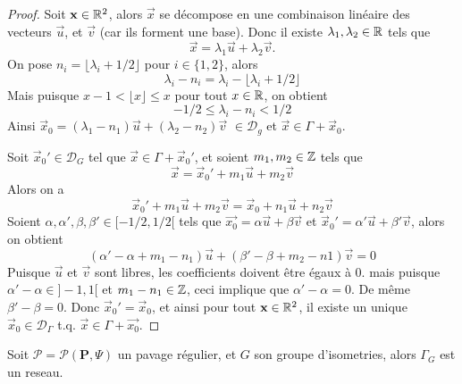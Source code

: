 \begin{proof}
	Soit $\mathbf{x} \in \mathbb{R}^2$, alors $\vec{x}$ se décompose en une combinaison
	linéaire des vecteurs $\vec{u}$, et $\vec{v}$ (car ils forment une base).
	Donc il existe $\lambda_1, \lambda_2 \in \mathbb{R}$ tels que
	\begin{equation*}
		\vec{x} = \lambda_1 \vec{u} + \lambda_2 \vec{v}.
	\end{equation*}
	On pose $n_i = \lfloor \lambda_i + 1/2 \rfloor$ pour $i \in \{1, 2\}$, alors 
	\begin{equation*}
		\lambda_i - n_i = \lambda_i - \lfloor \lambda_i + 1/2 \rfloor
	\end{equation*}
	Mais puisque $x - 1 < \lfloor x \rfloor \leq x$ pour tout $x \in \mathbb{R}$, on
	obtient
	\begin{equation*}
		-1/2 \leq \lambda_i - n_i < 1/2	
	\end{equation*}
	Ainsi $\vec{x}_0 = (\lambda_1 - n_1)\vec{u} + (\lambda_2 - n_2)\vec{v}$
	$\in \mathcal{D}_g$ et $\vec{x} \in \Gamma + \vec{x}_0$.

	Soit $\vec{x}_0' \in \mathcal{D}_G$ tel que $\vec{x} \in \Gamma + \vec{x}_0'$,
	et soient $m_1, m_2 \in \mathbb{Z}$ tels que
	\begin{equation*}
		\vec{x} = \vec{x}_0' + m_1\vec{u} + m_2\vec{v}
	\end{equation*}
	Alors on a
	\begin{equation*}
		\vec{x}_0' + m_1\vec{u} + m_2\vec{v} = \vec{x}_0 + n_1\vec{u} + n_2\vec{v}
	\end{equation*}
	Soient $\alpha, \alpha', \beta, \beta' \in [-1/2, 1/2[$ tels que
	$\vec{x_0} = \alpha\vec{u} + \beta\vec{v}$ et
	$\vec{x}_0' = \alpha'\vec{u} + \beta'\vec{v}$, alors on obtient
	\begin{equation*}
		(\alpha' - \alpha + m_1 - n_1)\vec{u} + (\beta'-\beta + m_2 - n1)\vec{v} = 0
	\end{equation*}
	Puisque $\vec{u}$ et $\vec{v}$ sont libres, les coefficients doivent être
	égaux à 0. mais puisque $\alpha' - \alpha \in ]-1, 1[$ et $m_1 - n_1 \in \mathbb{Z}$,
	ceci implique que $\alpha' - \alpha = 0$. De même $\beta' - \beta = 0$.
	Donc $\vec{x}_0' = \vec{x}_0$, et ainsi pour tout $\mathbf{x} \in \mathbb{R}^2$,
	il existe un unique $\vec{x}_0 \in \mathcal{D}_\Gamma$ t.q.
	$\vec{x} \in \Gamma + \vec{x_0}$.
\end{proof}

\begin{theorem}
	\label{thm:translations-reseau}
	Soit $\mathcal{P} = \mathcal{P}(\mathbf{P}, \Psi)$ un pavage régulier, et
	$G$ son groupe d'isometries, alors $\Gamma_G$ est un reseau.
\end{theorem}

